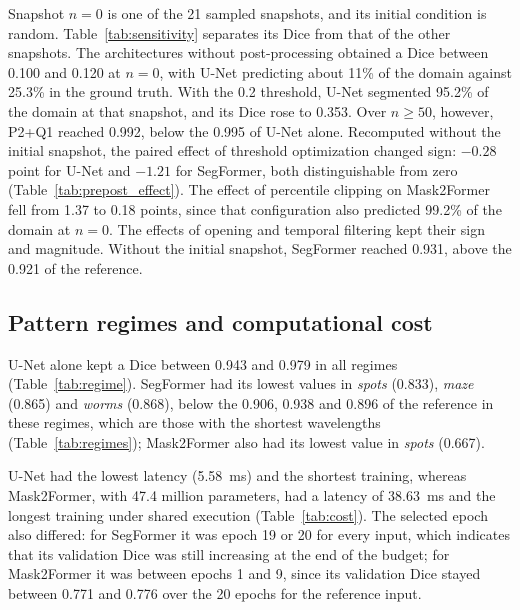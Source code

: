 \documentclass[final,5p,times,twocolumn]{elsarticle}
\begin{document}
Snapshot $n=0$ is one of the 21 sampled snapshots, and its initial condition is random. Table~\ref{tab:sensitivity} separates its Dice from that of the other snapshots. The architectures without post-processing obtained a Dice between 0.100 and 0.120 at $n=0$, with U-Net predicting about 11\% of the domain against 25.3\% in the ground truth. With the 0.2 threshold, U-Net segmented 95.2\% of the domain at that snapshot, and its Dice rose to 0.353. Over $n\geq50$, however, P2+Q1 reached 0.992, below the 0.995 of U-Net alone. Recomputed without the initial snapshot, the paired effect of threshold optimization changed sign: $-0.28$ point for U-Net and $-1.21$ for SegFormer, both distinguishable from zero (Table~\ref{tab:prepost_effect}). The effect of percentile clipping on Mask2Former fell from 1.37 to 0.18 points, since that configuration also predicted 99.2\% of the domain at $n=0$. The effects of opening and temporal filtering kept their sign and magnitude. Without the initial snapshot, SegFormer reached 0.931, above the 0.921 of the reference.



\subsection{Pattern regimes and computational cost}\label{subsec:regimes}

U-Net alone kept a Dice between 0.943 and 0.979 in all regimes (Table~\ref{tab:regime}). SegFormer had its lowest values in \textit{spots} (0.833), \textit{maze} (0.865) and \textit{worms} (0.868), below the 0.906, 0.938 and 0.896 of the reference in these regimes, which are those with the shortest wavelengths (Table~\ref{tab:regimes}); Mask2Former also had its lowest value in \textit{spots} (0.667).




U-Net had the lowest latency (5.58~ms) and the shortest training, whereas Mask2Former, with 47.4 million parameters, had a latency of 38.63~ms and the longest training under shared execution (Table~\ref{tab:cost}). The selected epoch also differed: for SegFormer it was epoch 19 or 20 for every input, which indicates that its validation Dice was still increasing at the end of the budget; for Mask2Former it was between epochs 1 and 9, since its validation Dice stayed between 0.771 and 0.776 over the 20 epochs for the reference input.

\end{document}
